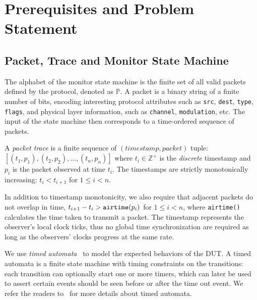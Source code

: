 \section{Prerequisites and Problem Statement}
\label{sec:background}

\subsection{Packet, Trace and Monitor State Machine}
\label{subsec:basic}

The alphabet of the monitor state machine is the finite set of all valid packets
defined by the protocol, denoted as $\mathbb{P}$.  A packet is a binary string
of a finite number of bits, encoding interesting protocol attributes such as
\texttt{src}, \texttt{dest}, \texttt{type}, \texttt{flags}, and physical layer
information, such as \texttt{channel}, \texttt{modulation}, etc. The input of
the state machine then corresponds to a time-ordered sequence of packets.

\begin{definition}
  A \textit{packet trace} is a finite sequence of $(timestamp, packet)$ tuple:
  $[(t_1, p_1), (t_2, p_2),\ldots,(t_n, p_n)]$ where $t_i \in \mathbb{Z}^+$ is
  the \textit{discrete} timestamp and $p_i$ is the packet observed at time
  $t_i$. The timestamps are strictly monotonically increasing: $t_i < t_{i+1}$
  for $1 \le i < n$.
\end{definition}%

In addition to timestamp monotonicity, we also require that adjacent packets do
not overlap in time, $t_{i+1}-t_i > \text{\texttt{airtime}}(p_i)$ for $1 \le i <
n$, where \texttt{airtime()} calculates the time taken to transmit a packet.
The timestamp represents the observer's local clock ticks, thus no global time
synchronization are required as long as the observers' clocks progress at the
same rate.

We use \textit{timed automata}~\cite{alur1994theory} to model the expected
behaviors of the DUT. A timed automata is a finite state machine with timing
constraints on the transitions: each transition can optionally start one or more
timers, which can later be used to assert certain events should be seen before
or after the time out event. We refer the readers to~\cite{alur1994theory} for
more details about timed automata.


